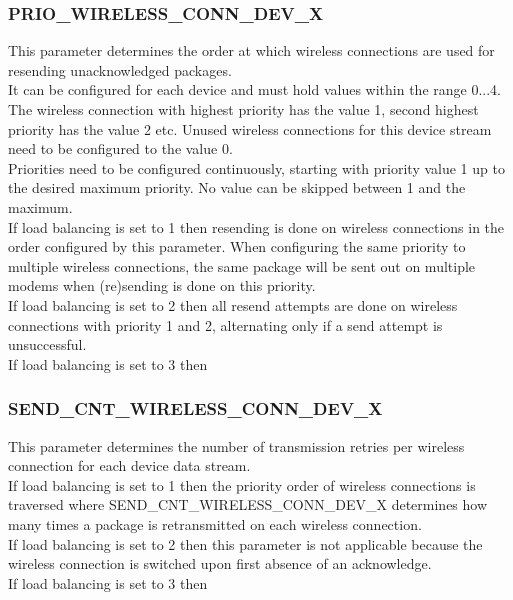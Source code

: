 \subsubsection{PRIO\_WIRELESS\_CONN\_DEV\_X}
This parameter determines the order at which wireless connections are used for resending unacknowledged packages.\\
It can be configured for each device and must hold values within the range 0...4. The wireless connection with highest priority has the value 1, second highest priority has the value 2 etc. Unused wireless connections for this device stream need to be configured to the value 0.\\
Priorities need to be configured continuously, starting with priority value 1 up to the desired maximum priority. No value can be skipped between 1 and the maximum.\\
If load balancing is set to 1 then resending is done on wireless connections in the order configured by this parameter. When configuring the same priority to multiple wireless connections, the same package will be sent out on multiple modems when (re)sending is done on this priority.\\
If load balancing is set to 2 then all resend attempts are done on wireless connections with priority 1 and 2, alternating only if a send attempt is unsuccessful.\\
If load balancing is set to 3 then 
%
\subsubsection{SEND\_CNT\_WIRELESS\_CONN\_DEV\_X}
This parameter determines the number of transmission retries per wireless connection for each device data stream.\\
If load balancing is set to 1 then the priority order of wireless connections is traversed where SEND\_CNT\_WIRELESS\_CONN\_DEV\_X determines how many times a package is retransmitted on each wireless connection.\\
If load balancing is set to 2 then this parameter is not applicable because the wireless connection is switched upon first absence of an acknowledge.\\
If load balancing is set to 3 then 
%
